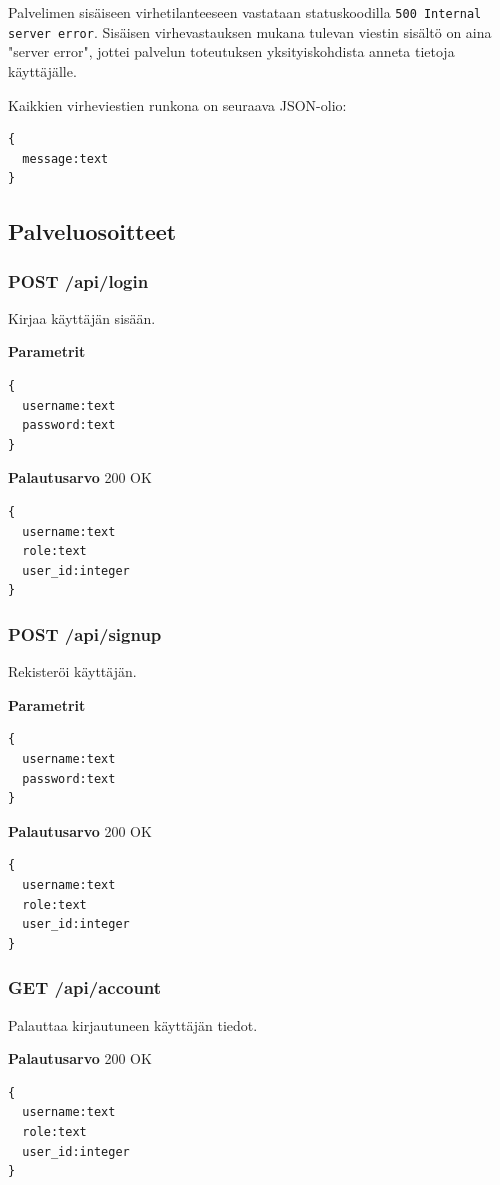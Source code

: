 \documentclass[a4paper,parskip=half]{scrartcl}
\begin{document}
Palvelimen sisäiseen virhetilanteeseen vastataan statuskoodilla \texttt{500
Internal server error}. Sisäisen virhevastauksen mukana tulevan viestin sisältö
on aina "server error", jottei palvelun toteutuksen yksityiskohdista anneta
tietoja käyttäjälle.

Kaikkien virheviestien runkona on seuraava JSON-olio:
\begin{Verbatim}
{
  message:text
}
\end{Verbatim}

\subsection{Palveluosoitteet}

\subsubsection{POST /api/login}
Kirjaa käyttäjän sisään.

\textbf{Parametrit}
\begin{Verbatim}
{
  username:text
  password:text
}
\end{Verbatim}

\textbf{Palautusarvo}
200 OK
\begin{Verbatim}
{
  username:text
  role:text
  user_id:integer
}
\end{Verbatim}

\subsubsection{POST /api/signup}
Rekisteröi käyttäjän.

\textbf{Parametrit}
\begin{Verbatim}
{
  username:text
  password:text
}
\end{Verbatim}

\textbf{Palautusarvo}
200 OK
\begin{Verbatim}
{
  username:text
  role:text
  user_id:integer
}
\end{Verbatim}

\subsubsection{GET /api/account}
Palauttaa kirjautuneen käyttäjän tiedot.

\textbf{Palautusarvo}
200 OK
\begin{Verbatim}
{
  username:text
  role:text
  user_id:integer
}
\end{Verbatim}
\end{document}
